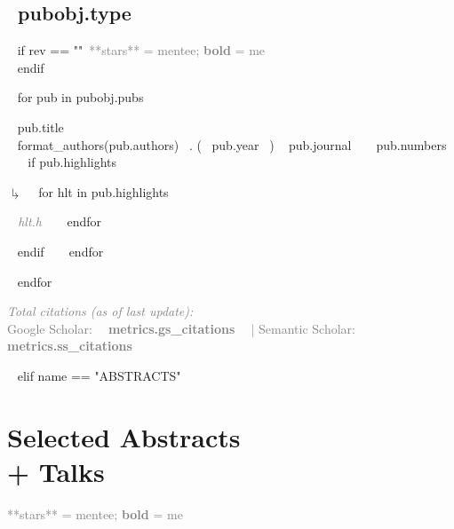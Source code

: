 \subsection{~{{pubobj.type}}~} 
~{ if rev == ""}~\textcolor{grey}{**stars** = mentee; \textbf{bold} = me}\\~{ endif }~
\begin{etaremune}[~{{ rev }}~itemindent=-1.5\bibhang, topsep=0pt,
				   itemsep=\bibsep,partopsep=0pt,parsep=0pt,leftmargin={\bibhang+\widthof{[999]}}] 
    ~{ for pub in pubobj.pubs  }~
    \item ~{{ pub.title }}~ \\
     ~{{ format_authors(pub.authors) }}~. (~{{ pub.year }}~) ~{{ pub.journal }}~ ~{{ pub.numbers }}~
     ~{ if pub.highlights }~
     	\begin{list}{$\drsh$}{}
     	~{ for hlt in pub.highlights }~
	      \item \textcolor{grey}{\textit{~{{ hlt.h }}~} }
     	~{ endfor }~
     	\end{list} 
     ~{ endif }~
	~{ endfor }~

\end{etaremune}

~{ endfor }~

\vspace{0.5cm}
\textcolor{grey}{
\textit{Total citations (as of last update):} \\
\textbf{\aiGoogleScholar} \hspace{0.05cm} Google Scholar: \textbf{~{{ metrics.gs_citations }}~} | \textbf{\aiSemanticScholar} \hspace{0.05cm} Semantic Scholar: \textbf{~{{ metrics.ss_citations }}~}\\
}


~{ elif name == "ABSTRACTS" }~

\section{Selected Abstracts\\+ Talks}
\textcolor{grey}{**stars** = mentee; \textbf{bold} = me}\\

